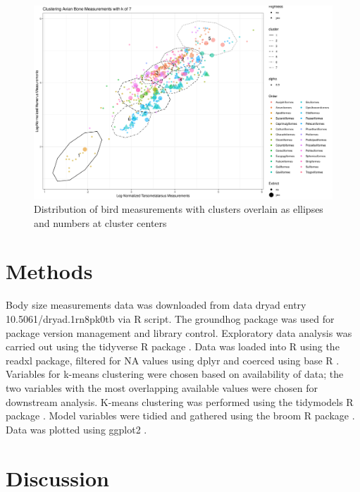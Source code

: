 \documentclass{bioinfo}
\begin{document}
\begin{figure}
\includegraphics[width=1\linewidth]{../outputs/final_clustered_plot} \caption{Distribution of bird measurements with clusters overlain as ellipses and numbers at cluster centers}\label{fig:figure4}
\end{figure}

\section{Methods}

Body size measurements data was downloaded from data dryad entry
10.5061/dryad.1rn8pk0tb via R script. The groundhog package was used for
package version management and library control. Exploratory data
analysis was carried out using the tidyverse R package \citep{tidy}.
Data was loaded into R using the readxl package, filtered for NA values
using dplyr and coerced using base R \citep{read} \citep{dplyr}.
Variables for k-means clustering were chosen based on availability of
data; the two variables with the most overlapping available values were
chosen for downstream analysis. K-means clustering was performed using
the tidymodels R package \citep{kuhn_tidymodels_2020}. Model variables
were tidied and gathered using the broom R package \citep{broom}. Data
was plotted using ggplot2 \citep{ggplot}.

\section{Discussion}
\end{document}
